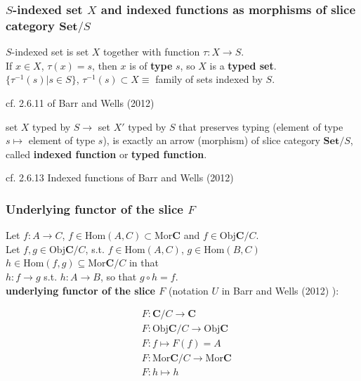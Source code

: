 \subsubsection{$S$-indexed set $X$ and indexed functions as morphisms of slice category $\mathbf{Set}/S$}

\begin{definition}
	$S$-indexed set is set $X$ together with function $\tau : X \to S$. \\
	
	If $x\in X$, $\tau(x) = s$, then $x$ is of \textbf{type} $s$, so $X$ is a \textbf{typed set}. \\
	
	$\lbrace \tau^{-1}(s) | s \in S \rbrace$, $\tau^{-1}(s) \subset X \equiv $ family of sets indexed by $S$. \\
	
\end{definition} 
cf. 2.6.11 of Barr and Wells (2012) \cite{agat:BaWe2012}

\begin{definition}
	set $X$ typed by $S \to $ set $X'$ typed by $S$ that preserves typing (element of type $s\mapsto $ element of type $s$), is exactly an arrow (morphism) of slice category $\mathbf{Set}/S$, called \textbf{indexed function} or \textbf{typed function}.
\end{definition}

cf. 2.6.13 Indexed functions of Barr and Wells (2012) \cite{agat:BaWe2012}

\subsubsection{Underlying functor of the slice $F$}

Let $f: A\to C$, $f\in \text{Hom}(A,C) \subset \text{Mor}\mathbf{C}$ and $f\in \text{Obj}\mathbf{C}/C$.  \\

Let $f,g \in \text{Obj}\mathbf{C}/C$, s.t. $f\in \text{Hom}(A,C)$, $g\in \text{Hom}(B,C)$ \\
$h\in \text{Hom}(f,g) \subseteq \text{Mor}\mathbf{C}/C$ in that \\
$h : f\to g$ s.t. $h:A \to B$, so that $g\circ h = f$. \\

\textbf{underlying functor of the slice $F$} (notation $U$ in Barr and Wells (2012) \cite{agat:BaWe2012}):

\begin{equation}
\begin{aligned}
& F: \mathbf{C} /C \to \mathbf{C} \\ 
& F:\text{Obj}\mathbf{C}/C \to \text{Obj}\mathbf{C} \\ 
& F:f\mapsto F(f) = A \\ 
& F:\text{Mor}\mathbf{C}/C \to \text{Mor}\mathbf{C} \\ 
& F: h \mapsto h 
\end{aligned} 
\end{equation}

